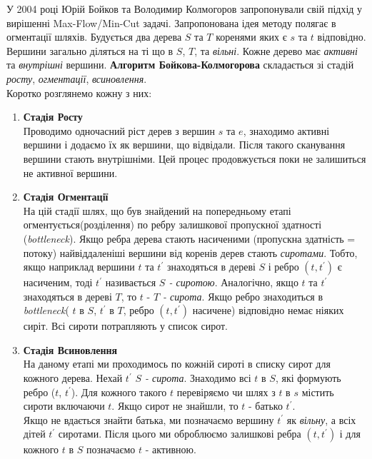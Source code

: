 У 2004 році Юрій Бойков та Володимир Колмогоров запропонували свій підхід \cite{boykov_kolmogorov}
у вирішенні Max-Flow/Min-Cut задачі.
Запропонована ідея методу полягає в огментації шляхів. Будується два дерева $S$ та $T$
коренями яких є $s$ та $t$ відповідно. Вершини загально діляться на ті що в $S$, $T$, та
\textit{вільні}. Кожне дерево має \textit{активні} та \textit{внутрішні} вершини.
\textbf{Алгоритм Бойкова-Колмогорова} складається зі стадій \textit{росту},
\textit{огментації}, \textit{всиновлення}.\\
Коротко розглянемо кожну з них:

\begin{enumerate}
    \item \textbf{Стадія Росту} \\
          Проводимо одночасний ріст дерев з вершин $s$ та $e$, знаходимо активні
          вершини і додаємо їх як вершини, що відвідали. Після такого сканування вершини
          стають внутрішніми. Цей процес продовжується поки не залишиться не активної вершини.
    \item \textbf{Стадія Огментації} \\
          На цій стадії шлях, що був знайдений на попередньому етапі огментується(розділення)
          по ребру залишкової пропускної здатності (\textit{bottleneck}). Якщо ребра дерева стають
          насиченими (пропускна здатність = потоку) найвіддаленіші вершини від коренів дерев стають
          \textit{сиротами}. Тобто, якщо наприклад вершини $t$ та $t^{'}$ знаходяться в дереві $S$
          і ребро $(t,t^{'})$ є насиченим, тоді $t^{'}$ називається \textit{$S$ - сиротою}.
          Аналогічно, якщо $t$ та $t^{'}$ знаходяться в дереві $T$, то  $t$ - \textit{$T$ - сирота}.
          Якщо ребро знаходиться в \textit{bottleneck}( $t$ в $S$, $t^{'}$ в $T$, ребро $(t,t^{'})$
          насичене) відповідно немає ніяких сиріт. Всі сироти потрапляють у список сирот.
    \item \textbf{Стадія Всиновлення} \\
          На даному етапі ми проходимось по кожній сироті в списку сирот для кожного дерева.
          Нехай $t^{'}$ \textit{$S$ - сирота}. Знаходимо всі $t$  в $S$, які формують ребро
          ($t$, $t^{'}$). Для кожного такого $t$ перевіряємо чи шлях з $t$ в $s$ містить сироти
          включаючи $t$. Якщо сирот не знайшли, то $t$ - батько  $t^{'}$. \\
          Якщо не вдається знайти батька, ми позначаємо вершину $t^{'}$ як \textit{вільну}, а всіх
          дітей $t^{'}$ сиротами. Після цього ми оброблюємо залишкові ребра $(t,t^{'})$ і для кожного $t$ в $S$ позначаємо
          $t$ - активною.
\end{enumerate}


